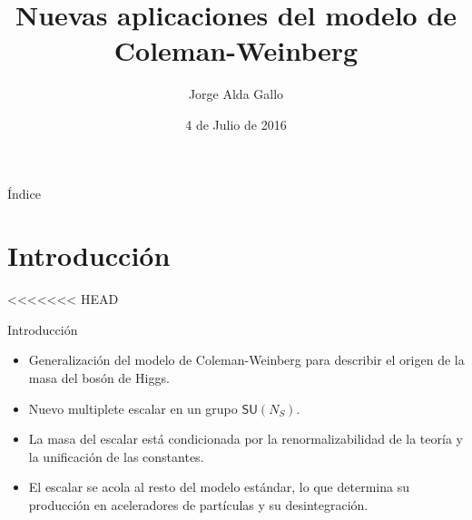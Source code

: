 \documentclass{beamer}
\author{Jorge Alda Gallo}
\title{Nuevas aplicaciones del modelo de Coleman-Weinberg}
\institute{Departamento de Física Teórica I, Universidad Complutense de Madrid}
\date{4 de Julio de 2016}
\begin{document}
\begin{frame}[t, plain]
\titlepage
\end{frame}

\begin{frame}[t]{Índice}
\tableofcontents
\end{frame}

\section{Introducción}
<<<<<<< HEAD
\begin{frame}{Introducción}
\begin{itemize}
\item Generalización del modelo de Coleman-Weinberg para describir el origen de la masa del bosón de Higgs.
\item Nuevo multiplete escalar en un grupo $\mathsf{SU}(N_S)$.
\item La masa del escalar está condicionada por la renormalizabilidad de la teoría y la unificación de las constantes. 
\item El escalar se acola al resto del modelo estándar, lo que determina su producción en aceleradores de partículas y su desintegración.
\end{itemize}
\end{frame}
\end{document}
